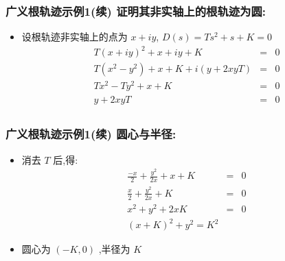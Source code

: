 \documentclass{article}
\begin{document}
\begin{frame}
\frametitle{广义根轨迹示例1(续) 证明其非实轴上的根轨迹为圆:}
\label{sec-3-1-4}

\begin{itemize}
\item 设根轨迹非实轴上的点为 $x+iy$, $D(s) = Ts^2+s+K=0$
       	\begin{eqnarray*}
       	T(x+iy)^2+x+iy+K &=& 0 \\
       	T(x^2-y^2)+x+K+i(y+2xyT) &=& 0 \\
       	Tx^2-Ty^2+x+K &=& 0 \\
       	y+2xyT &=& 0 \\
       	\end{eqnarray*}
\end{itemize}
\end{frame}
\begin{frame}
\frametitle{广义根轨迹示例1(续) 圆心与半径:}
\label{sec-3-1-5}

\begin{itemize}
\item 消去 $T$ 后,得:
       	\begin{eqnarray*}
       	\frac{-x}{2}+\frac{y^2}{2x}+x+K & = & 0 \\
       	\frac{x}{2}+\frac{y^2}{2x}+K & = & 0 \\
       	x^2+y^2+2xK & = & 0 \\
       	(x+K)^2+y^2=K^2 
       	\end{eqnarray*}
\item <2-> 圆心为 $(-K,0)$ ,半径为 $K$
\end{itemize}
\end{frame}
\end{document}
